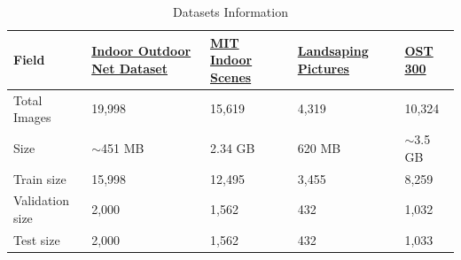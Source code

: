 \documentclass[a4paper]{article}
\begin{document}
\begin{table}[H]
    \centering
    \caption{Datasets Information}
    \label{tab:datasets}
    \begin{tabular}{@{}lllll@{}}
        \toprule
        \textbf{Field}  & \href{https://huggingface.co/datasets/prithivMLmods/IndoorOutdoorNet-20K}{\textbf{Indoor Outdoor Net Dataset}} & \href{https://www.kaggle.com/datasets/itsahmad/indoor-scenes-cvpr-2019}{\textbf{MIT Indoor Scenes}} & \href{https://www.kaggle.com/datasets/arnaud58/landscape-pictures}{\textbf{Landsaping Pictures}} & \href{https://paperswithcode.com/dataset/ost300}{\textbf{OST 300}} \\ \midrule
        Total Images    & 19,998                                                                                                         & 15,619                                                                                              & 4,319                                                                                            & 10,324                                                             \\
        Size            & $\sim$451 MB                                                                                                   & 2.34 GB                                                                                             & 620 MB                                                                                           & $\sim$3.5 GB                                                       \\
        Train size      & 15,998                                                                                                         & 12,495                                                                                              & 3,455                                                                                            & 8,259                                                              \\
        Validation size & 2,000                                                                                                          & 1,562                                                                                               & 432                                                                                              & 1,032                                                              \\
        Test size       & 2,000                                                                                                          & 1,562                                                                                               & 432                                                                                              & 1,033                                                              \\

\end{tabular}
\end{table}
\end{document}
